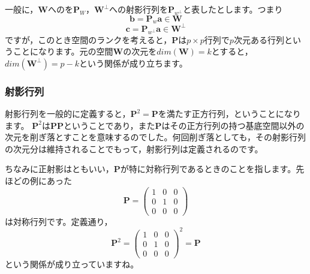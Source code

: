 \documentclass{ltjsbook}
\begin{document}
一般に，$\bm{W}$へのを$\bm{P}_W$，$\bm{W}^{\perp}$への射影行列を$\bm{P}_{w^{\perp}} $と表したとします。つまり
\[ \bm{b} = \bm{P}_w \bm{a} \in \bm{W} \]
\[ \bm{c} = \bm{P}_{w^{\perp}} \bm{a} \in \bm{W}^{\perp} \]
ですが，このとき空間のランクを考えると，$\bm{P}$は$p \times p$行列で$p$次元ある行列ということになります。元の空間$\bm{W}$の次元を$dim(\bm{W})=k$とすると，$dim(\bm{W}^{\perp})=p-k$という関係が成り立ちます。

\subsubsection{射影行列}
\label{ProjectionMatrix}
射影行列を一般的に定義すると，$\bm{P}^2 = \bm{P}$を満たす正方行列，ということになります。
$\bm{P}^2$は$\bm{PP}$ということであり，また$\bm{P}$はその正方行列の持つ基底空間以外の次元を削ぎ落とすことを意味するのでした。何回削ぎ落としても，その射影行列の次元分は維持されることでもって，射影行列は定義されるのです。

ちなみに正射影はともいい，$\bm{P}$が特に対称行列であるときのことを指します。先ほどの例にあった
\[ \bm{P} =  \begin{pmatrix} 1 & 0 & 0 \\ 0 & 1 & 0 \\ 0 & 0 & 0 \end{pmatrix} \]
は対称行列です。定義通り，
\[ \bm{P}^2 = \begin{pmatrix} 1 & 0 & 0 \\ 0 & 1 & 0 \\ 0 & 0 & 0 \end{pmatrix}^2 = \bm{P} \]
という関係が成り立っていますね。
\end{document}
